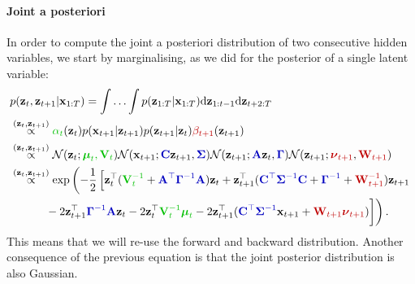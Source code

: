 \paragraph{Joint a posteriori}
In order to compute the joint a posteriori distribution of two consecutive hidden variables, we start by marginalising, as we did for the posterior of a single latent variable:
\begin{align}
 &p(\bs{z}_t,\bs{z}_{t+1}|\bs{x}_{1:T}) = \int\ldots\int p(\bs{z}_{1:T}|\bs{x}_{1:T})\textrm{d}\bs{z}_{1:t-1}\textrm{d}\bs{z}_{t+2:T} \\
 &\stackrel{(\bs{z}_t,\bs{z}_{t+1})}{\propto} \paint{mygreen}{\alpha_t}(\bs{z}_t)p(\bs{x}_{t+1}|\bs{z}_{t+1})p(\bs{z}_{t+1}|\bs{z}_t)\paint{myred}{\beta_{t+1}}(\bs{z}_{t+1})\\
 &\stackrel{(\bs{z}_t,\bs{z}_{t+1})}{\propto} {\cal N}(\bs{z}_t;\paint{mygreen}{\boldsymbol{\mu}_t,\bs{V}_t}) {\cal N}(\bs{x}_{t+1};\paint{myblue}{\bs{C}}\bs{z}_{t+1},\paint{myblue}{\bs{\Sigma}}) {\cal N}(\bs{z}_{t+1};\paint{myblue}{\bs{A}}\bs{z}_t,\paint{myblue}{\bs{\Gamma}}) {\cal N}(\bs{z}_{t+1};\paint{myred}{\boldsymbol{\nu}_{t+1}},\paint{myred}{\bs{W}_{t+1}})\\
 &\stackrel{(\bs{z}_t,\bs{z}_{t+1})}{\propto} \textrm{exp}\left(-\frac{1}{2}\left[ \bs{z}_t^\top(\paint{mygreen}{\bs{V}_t^{-1}} + \paint{myblue}{\bs{A}^\top\bs{\Gamma}^{-1}\bs{A}})\bs{z}_t + \bs{z}_{t+1}^\top(\paint{myblue}{\bs{C}^\top\bs{\Sigma}^{-1}\bs{C}} + \paint{myblue}{\bs{\Gamma}^{-1}} + \paint{myred}{\bs{W}_{t+1}^{-1}})\bs{z}_{t+1}\right.\right.\nonumber\\
 & \qquad\left.\left. \phantom{\frac{1}{2}} - 2\bs{z}_{t+1}^\top\paint{myblue}{\bs{\Gamma}^{-1}\bs{A}}\bs{z}_t-2\bs{z}_t^\top\paint{mygreen}{\bs{V}_t^{-1}\boldsymbol{\mu}_t} - 2\bs{z}_{t+1}^\top(\paint{myblue}{\bs{C}^\top\bs{\Sigma}^{-1}}\bs{x}_{t+1} + \paint{myred}{\bs{W}_{t+1}\boldsymbol{\nu}_{t+1}}) \right]\right).
\end{align}
This means that we will re-use the forward and backward distribution. Another consequence of the previous equation is that the joint posterior distribution is also Gaussian.

